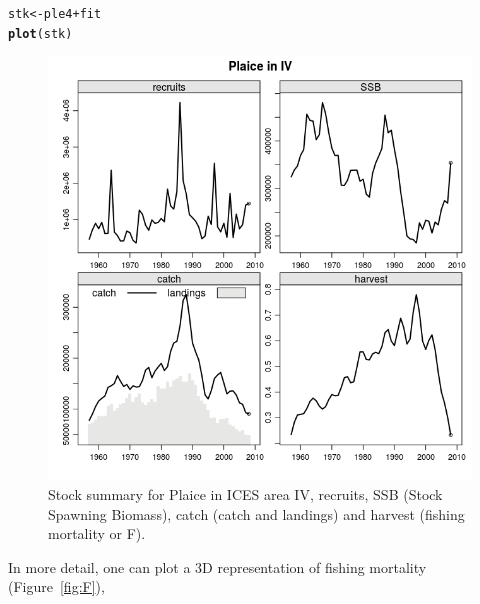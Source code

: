 \documentclass[a4paper,english,10pt]{article}\usepackage[]{graphicx}\usepackage[]{color}
\makeatletter
\def\maxwidth{ %
  \ifdim\Gin@nat@width>\linewidth
    \linewidth
  \else
    \Gin@nat@width
  \fi
}
\newcommand{\hlopt}[1]{\textcolor[rgb]{0,0,0}{#1}}%
\newcommand{\hlstd}[1]{\textcolor[rgb]{0.345,0.345,0.345}{#1}}%
\newcommand{\hlkwb}[1]{\textcolor[rgb]{0.69,0.353,0.396}{#1}}%
\newcommand{\hlkwd}[1]{\textcolor[rgb]{0.737,0.353,0.396}{\textbf{#1}}}%
\newenvironment{kframe}{%
 \def\at@end@of@kframe{}%
 \ifinner\ifhmode%
  \def\at@end@of@kframe{\end{minipage}}%
  \begin{minipage}{\columnwidth}%
 \fi\fi%
 \def\FrameCommand##1{\hskip\@totalleftmargin \hskip-\fboxsep
 \colorbox{shadecolor}{##1}\hskip-\fboxsep
     \hskip-\linewidth \hskip-\@totalleftmargin \hskip\columnwidth}%
 \MakeFramed {\advance\hsize-\width
   \@totalleftmargin\z@ \linewidth\hsize
   \@setminipage}}%
 {\par\unskip\endMakeFramed%
 \at@end@of@kframe}
\newenvironment{knitrout}{}{} %
\makeatother
\begin{document}
\begin{knitrout}
\color{fgcolor}\begin{kframe}
\begin{alltt}
\hlstd{stk} \hlkwb{<-} \hlstd{ple4} \hlopt{+} \hlstd{fit}
\hlkwd{plot}\hlstd{(stk)}
\end{alltt}
\end{kframe}\begin{figure}[H]

{\centering \includegraphics[width=\maxwidth]{figure/summ-1} 

}

\caption[Stock summary for Plaice in ICES area IV, recruits, SSB (Stock Spawning Biomass), catch (catch and landings) and harvest (fishing mortality or F)]{Stock summary for Plaice in ICES area IV, recruits, SSB (Stock Spawning Biomass), catch (catch and landings) and harvest (fishing mortality or F).}\label{fig:summ}
\end{figure}


\end{knitrout}

In more detail, one can plot a 3D representation of fishing mortality (Figure~\ref{fig:F}),
\end{document}
